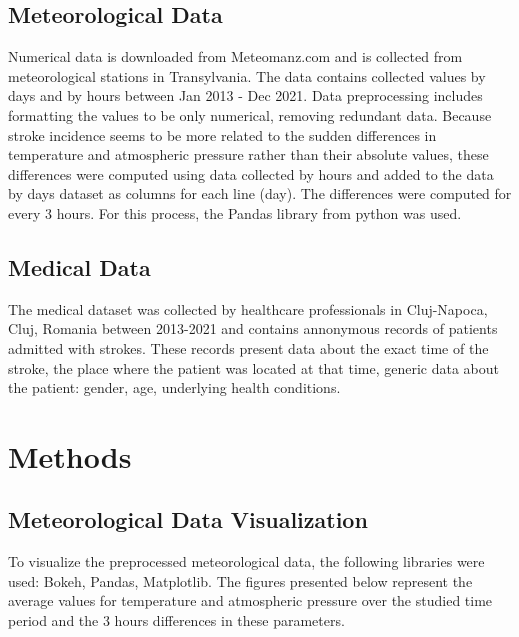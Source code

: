 \documentclass{article}
\begin{document}
\subsection{Meteorological Data}
Numerical data is downloaded from Meteomanz.com and is collected from meteorological stations in Transylvania. The data contains collected values by days and by hours between Jan 2013 - Dec 2021. Data preprocessing includes formatting the values to be only numerical, removing redundant data. Because stroke incidence seems to be more related to the sudden differences in temperature and atmospheric pressure rather than their absolute values, these differences were computed using data collected by hours and added to the data by days dataset as columns for each line (day). The differences were computed for every 3 hours. For this process, the Pandas library from python was used. 

\subsection{Medical Data}

The medical dataset was collected by healthcare professionals in Cluj-Napoca, Cluj, Romania between 2013-2021 and contains annonymous records of patients admitted with strokes. These records present data about the exact time of the stroke, the place where the patient was located at that time, generic data about the patient: gender, age, underlying health conditions. 


\section{Methods}
\subsection{Meteorological Data Visualization}

To visualize the preprocessed meteorological data, the following libraries were used: Bokeh, Pandas, Matplotlib. The figures presented below represent the average values for temperature and atmospheric pressure over the studied time period and the 3 hours differences in these parameters.
\end{document}

